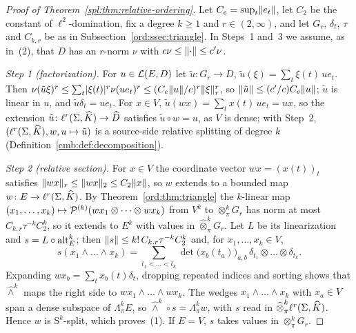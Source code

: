 \begin{proof}[Proof of Theorem~\ref{spl:thm:relative-ordering}]
Let $C_e=\sup_t\lVert e_t\rVert$, let $C_2$ be the constant of $\ell^2$\nobreakdash-domination, fix a degree $k\ge1$ and
$r\in(2,\infty)$, and let $G_r$, $\delta_t$, $\tau$ and $C_{k,r}$ be as in Subsection~\ref{ord:ssec:triangle}. In
Steps~1 and~3 we assume, as in~(2), that $D$ has an $r$\nobreakdash-norm $\nu$ with $c\nu\le\lVert \cdot\rVert\le c'\nu$.

\emph{Step 1 (factorization).} For $u\in\mathcal L(E,D)$ let $\tilde u\colon G_r\to D$, $\tilde u(\xi)=\sum_t\xi(t)\,ue_t$. Then
$\nu(\tilde u\xi)^r\le\sum_t\lvert \xi(t)\rvert^r\nu(ue_t)^r\le(C_e\lVert u\rVert/c)^r\lVert \xi\rVert_r^r$, so
$\lVert \tilde u\rVert\le(c'/c)C_e\lVert u\rVert$; $\tilde u$ is linear in $u$, and $\tilde u\delta_t=ue_t$. For $x\in V$,
$\tilde u(wx)=\sum_tx(t)\,ue_t=ux$, so the extension $\tilde u\colon\ell^r(\Sigma,\widehat K)\to\widehat D$ satisfies
$\tilde u\circ w=u$, as $V$ is dense; with Step~2, $(\ell^r(\Sigma,\widehat K),w,u\mapsto\tilde u)$ is a source-side relative
splitting of degree $k$ (Definition~\ref{cmb:def:decomposition}).

\emph{Step 2 (relative section).} For $x\in V$ the coordinate vector $wx=(x(t))_t$ satisfies
$\lVert wx\rVert_r\le\lVert wx\rVert_2\le C_2\lVert x\rVert$, so $w$ extends to a bounded map $w\colon E\to\ell^r(\Sigma,\widehat K)$. By
Theorem~\ref{ord:thm:triangle} the $k$\nobreakdash-linear map $(x_1,\dots,x_k)\mapsto\mathcal P^{(k)}(wx_1\otimes\dots\otimes wx_k)$
from $V^k$ to $\otimes^k_\pi G_r$ has norm at most $C_{k,r}\tau^{-k}C_2^k$, so it extends to $E^k$ with values in
$\widehat\otimes^k_\pi G_r$. Let $L$ be its linearization and $s=L\circ\operatorname{alt}^k_E$; then
$\lVert s\rVert\le k!\,C_{k,r}\tau^{-k}C_2^k$ and, for $x_1,\dots,x_k\in V$,
\begin{equation}\label{ord:eq:relative-section}
 s(x_1\wedge\dots\wedge x_k)=\sum_{t_1<\dots<t_k}\det\bigl(x_b(t_a)\bigr)_{a,b}\,\delta_{t_1}\otimes\dots\otimes\delta_{t_k}.
\end{equation}
Expanding $wx_b=\sum_tx_b(t)\delta_t$, dropping repeated indices and sorting shows that $\widehat\wedge^k$ maps the
right side to $wx_1\wedge\dots\wedge wx_k$. The wedges $x_1\wedge\dots\wedge x_k$ with $x_a\in V$ span a dense
subspace of $\Lambda^k_\pi E$, so $\widehat\wedge^k\circ s=\Lambda^k_\pi w$, with $s$ read in
$\widehat\otimes^k_\pi\ell^r(\Sigma,\widehat K)$. Hence $w$ is $\mathrm S^k$\nobreakdash-split, which proves~(1). If $E=V$, $s$ takes values in
$\otimes^k_\pi G_r$.


\end{proof}
